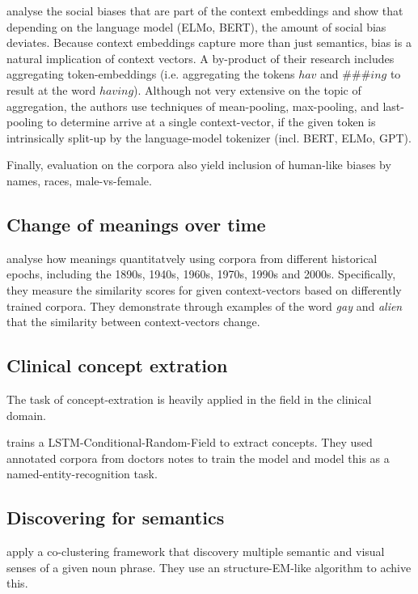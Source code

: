 \documentclass[a4paper,12pt,twoside,openright]{report}
\begin{document}
\cite{may19} analyse the social biases that are part of the context embeddings and show that depending on the language model (ELMo, BERT), the amount of social bias deviates. 
Because context embeddings capture more than just semantics, bias is a natural implication of context vectors.
A by-product of their research includes aggregating token-embeddings (i.e. aggregating the tokens $hav$ and $\#\#\#ing$ to result at the word $having$).
Although not very extensive on the topic of aggregation, the authors  use techniques of mean-pooling, max-pooling, and last-pooling to determine arrive at a single context-vector, if the given token is intrinsically split-up by the language-model tokenizer (incl. BERT, ELMo, GPT).

Finally, evaluation on the corpora also yield inclusion of human-like biases \cite{jentzsch19} by names, races, male-vs-female.


\subsection{Change of meanings over time}

\cite{hu19} analyse how meanings quantitatvely using corpora from different historical epochs, including the 1890s, 1940s, 1960s, 1970s, 1990s and 2000s. 
Specifically, they measure the similarity scores for given context-vectors based on differently trained corpora.
They demonstrate through examples of the word \textit{gay} and \textit{alien} that the similarity between context-vectors change.

\subsection{Clinical concept extration}

The task of concept-extration is heavily applied in the field in the clinical domain.

\cite{zhu18} trains a LSTM-Conditional-Random-Field to extract concepts.
They used annotated corpora from doctors notes to train the model and model this as a named-entity-recognition task.


\subsection{Discovering for semantics}


\cite{chen19} apply a co-clustering framework that discovery multiple semantic and visual senses of a given noun phrase.
They use an structure-EM-like algorithm to achive this.
\end{document}
